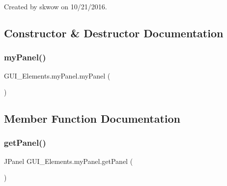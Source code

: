 Created by skwow on 10/21/2016. 

\subsection{Constructor \& Destructor Documentation}
\hypertarget{class_g_u_i___elements_1_1my_panel_a86c5274d56125927194bdb681d40a3bc}{}\label{class_g_u_i___elements_1_1my_panel_a86c5274d56125927194bdb681d40a3bc} 
\subsubsection{\texorpdfstring{my\+Panel()}{myPanel()}}
{\footnotesize\ttfamily G\+U\+I\+\_\+\+Elements.\+my\+Panel.\+my\+Panel (\begin{DoxyParamCaption}{ }\end{DoxyParamCaption})}



\subsection{Member Function Documentation}
\hypertarget{class_g_u_i___elements_1_1my_panel_abea57f39e7c7b1c89db73d173d71d978}{}\label{class_g_u_i___elements_1_1my_panel_abea57f39e7c7b1c89db73d173d71d978} 
\subsubsection{\texorpdfstring{get\+Panel()}{getPanel()}}
{\footnotesize\ttfamily J\+Panel G\+U\+I\+\_\+\+Elements.\+my\+Panel.\+get\+Panel (\begin{DoxyParamCaption}{ }\end{DoxyParamCaption})}

\hypertarget{class_g_u_i___elements_1_1my_panel_a0e7ebb816b28db3b3ee0af444afc7b32}{}\label{class_g_u_i___elements_1_1my_panel_a0e7ebb816b28db3b3ee0af444afc7b32} 
